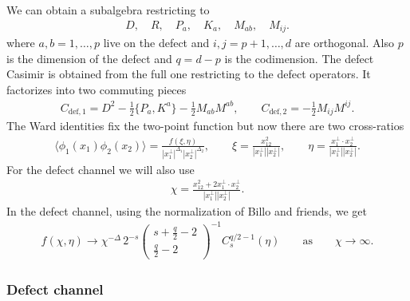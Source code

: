 \documentclass[letterpaper]{article}
\let\Oldsubsubsection\subsubsection
\renewcommand{\subsubsection}{\FloatBarrier\Oldsubsubsection}
\begin{document}
We can obtain a subalgebra restricting to
\begin{align}
 D, \quad
 R, \quad
 P_{a}, \quad
 K_{a}, \quad
 M_{ab}, \quad
 M_{ij}.
\end{align}
where $a,b = 1, \ldots, p$ live on the defect and $i,j= p+1, \ldots, d$ are orthogonal. Also $p$ is the dimension of the defect and $q  = d-p$ is the codimension.
The defect Casimir is obtained from the full one restricting to the defect operators.
It factorizes into two commuting pieces
\begin{align}
 C_{\text{def}, 1} = 
    D^2
  - \frac12 \{ P_{a}, K^{a} \}
  - \frac{1}{2} M_{ab} M^{ab}, \qquad
 C_{\text{def}, 2} 
  = - \frac{1}{2} M_{ij} M^{ij}.
\end{align}
The Ward identities fix the two-point function but now there are two cross-ratios
\begin{align}
 \langle \phi_1(x_1) \phi_2(x_2) \rangle
 = \frac{f(\xi, \eta)}{|x_1^\bot|^{\Delta_1} |x_2^\bot|^{\Delta_2}}, \qquad
 \xi = \frac{x_{12}^2}{|x_1^{\bot}| |x_2^{\bot}|}, \qquad
 \eta = \frac{x_{1}^\bot \cdot x_2^\bot}{|x_1^{\bot}| |x_2^{\bot}|}.
\end{align}
For the defect channel we will also use 
\begin{align}
 \chi = \frac{ x_{12}^2 + 2 x_1^\bot \cdot x_2^\bot}
             { |x_1^\bot| |x_2^\bot| } .
\end{align}
In the defect channel, using the normalization of Billo and friends, we get
\begin{align}
 f(\chi, \eta) 
 \to \chi^{-\Delta} \,
 2^{-s}
 \begin{pmatrix}
  s+ \frac{q}{2} -2 \\
  \frac{q}{2} -2
 \end{pmatrix}^{-1}
 C_{s}^{q/2-1}(\eta) 
 \qquad \text{as} \qquad
 \chi \to \infty.
\end{align}


\subsubsection{Defect channel}
\end{document}
